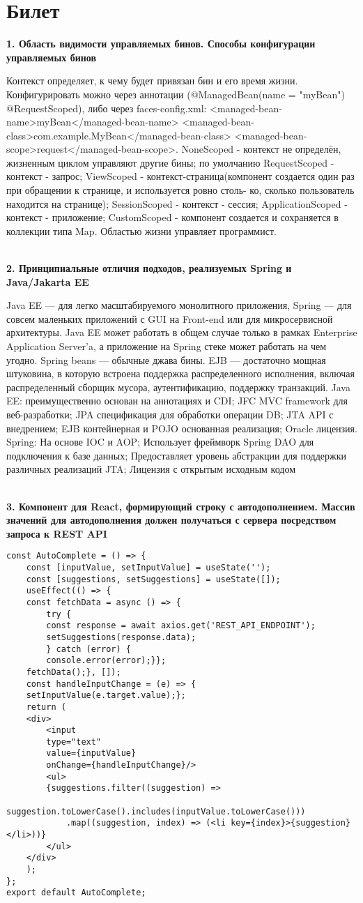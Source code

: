 \documentclass{article}
\newcommand{\bil}[5]{%
        \section{Билет}
        \textbf{1. #1}

        #4
        \\
        \textbf{2. #2}
        
        #5
        \\
        \textbf{3. #3}
}
\begin{document}
\bil{Область видимости управляемых бинов. Способы конфигурации управляемых бинов}
{Принципиальные отличия подходов, реализуемых Spring и Java/Jakarta EE}
{Компонент для React, формирующий строку с автодополнением. Массив значений для автодополнения должен получаться с сервера посредством запроса к REST API}{
    Контекст определяет, к чему будет привязан бин и его время жизни. 
    Конфигурировать можно через аннотации (@ManagedBean(name = "myBean") @RequestScoped), либо через faces-config.xml: 
    <managed-bean-name>myBean</managed-bean-name>
    <managed-bean-class>com.example.MyBean</managed-bean-class>
    <managed-bean-scope>request</managed-bean-scope>. 
    NoneScoped - контекст не определён, жизненным циклом управляют другие бины; по умолчанию RequestScoped - контекст - запрос; 
    ViewScoped - контекст-страница(компонент создается один раз при обращении к странице, и используется ровно столь- ко, сколько пользователь находится на странице); 
    SessionScoped - контекст - сессия; ApplicationScoped - контекст - приложение; 
    CustomScoped - компонент создается и сохраняется в коллекции типа Map. Областью жизни управляет программист.
}{
    Java EE — для легко масштабируемого монолитного приложения, Spring — для совсем маленьких приложений с GUI на Front-end или для микросервисной архитектуры.
    Java EE может работать в общем случае только в рамках Enterprise Application Server’a, а приложение на Spring стеке может работать на чем угодно.
    Spring beans — обычные джава бины. EJB — достаточно мощная штуковина, в которую встроена поддержка распределенного исполнения, 
    включая распределенный сборщик мусора, аутентификацию, поддержку транзакций. 
    Java EE:
    преимущественно основан на аннотациях и CDI;
    JFC MVC framework для веб-разработки;
    JPA спецификация для обработки операции DB;
    JTA API с внедрением;
    EJB контейнерная и POJO основанная реализация;
    Oracle лицензия.
    Spring: На основе IOC и AOP;
    Использует фреймворк Spring DAO для подключения к базе данных;
    Предоставляет уровень абстракции для поддержки различных реализаций JTA;
Лицензия с открытым исходным кодом
}
\begin{lstlisting}[frame=single, basicstyle=\ttfamily, breaklines=true, breakatwhitespace=true, postbreak=\mbox{\textcolor{red}{$\hookrightarrow$}\space}]
const AutoComplete = () => {
    const [inputValue, setInputValue] = useState('');
    const [suggestions, setSuggestions] = useState([]);
    useEffect(() => {
    const fetchData = async () => {
        try {
        const response = await axios.get('REST_API_ENDPOINT');
        setSuggestions(response.data);
        } catch (error) {
        console.error(error);}};
    fetchData();}, []); 
    const handleInputChange = (e) => {
    setInputValue(e.target.value);};
    return (
    <div>
        <input
        type="text"
        value={inputValue}
        onChange={handleInputChange}/>
        <ul>
        {suggestions.filter((suggestion) =>
            suggestion.toLowerCase().includes(inputValue.toLowerCase()))
            .map((suggestion, index) => (<li key={index}>{suggestion}</li>))}
        </ul>
    </div>
    );
};
export default AutoComplete;    
\end{lstlisting}
\end{document}
